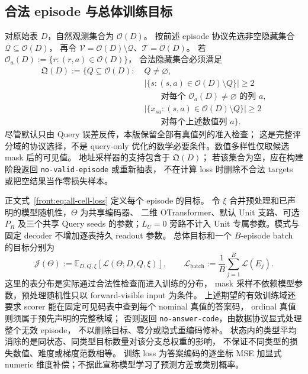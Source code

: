 \documentclass[11pt,UTF8,fontset=fandol]{ctexart}
\numberwithin{equation}{section}
\theoremstyle{definition}
\newcommand{\Oset}{\mathcal O}
\newcommand{\Vset}{\mathcal V}
\newcommand{\Qset}{\mathcal Q}
\newcommand{\TargetSet}{\mathcal T}
\begin{document}
\subsection{合法 episode 与总体训练目标}
对原始表 $D$，自然观测集合为 $\Oset(D)$。
按前述 episode 协议先选非空隐藏集合 $\Qset\subseteq\Oset(D)$，
再令 $\Vset=\Oset(D)\setminus\Qset$、$\TargetSet=\Oset(D)$。
若 $\Oset_a(D):=\{r:(r,a)\in\Oset(D)\}$，
合法隐藏集合必须满足
\begin{equation}
\begin{split}
 \mathfrak Q(D):=\bigl\{Q\subseteq\Oset(D):\;&Q\ne\varnothing,\\
 &|\{s:(s,a)\in\Oset(D)\setminus Q\}|\ge2\\
 &\qquad\text{对每个 }\Oset_a(D)\ne\varnothing\text{ 的列 }a,\\
 &|\{x_{sa}:(s,a)\in\Oset(D)\setminus Q\}|\ge2\\
 &\qquad\text{对每个上述数值列 }a\bigr\}.
\end{split}
\label{eq:T:admissible-masks}
\end{equation}
尽管默认只由 Query 误差反传，本版保留全部有真值列的准入检查；
这是完整评分域的协议选择，不是 query-only 优化的数学必要条件。数值多样性仅取候选 mask 后的可见值。
地址采样器的支持包含于 $\mathfrak Q(D)$；
若该集合为空，应在构建阶段返回 \texttt{no-valid-episode} 或重新抽表，
不在计算 loss 时删除不合法 targets 或把空结果当作零损失样本。

正文式~\eqref{front:eq:all-cell-loss} 定义每个 episode 的目标。
令 $\xi$ 合并预处理和已声明的模型随机性，$\Theta$ 为共享编码器、
二维 OTransformer、默认 Unit 支路、可选 $P_R$ 及三个共享 Query seeds 的参数；$L_U=0$ 旁路不计入 Unit 专属参数。模式与固定 decoder 不增加逐表持久 readout 参数。
总体目标和一个 $B$-episode batch 的目标分别为
\begin{equation}
 \mathcal J(\Theta)
 :=\mathbb E_{D,Q,\xi}\!\left[\mathcal L(\Theta;D,Q,\xi)\right],
 \qquad
 \mathcal L_{\mathrm{batch}}:=\frac1B\sum_{j=1}^B\mathcal L(E_j).
 \label{eq:T:population-objective}
\end{equation}
这里的表分布是实际通过合法性检查而进入训练的分布，
mask 采样不依赖模型参数，预处理随机性只以 forward-visible input 为条件。
上述期望的有效训练域还要求 scorer 能在固定可见码表中查到每个 nominal 真值的答案码，
ordinal 真值则须属于预先声明的完整秩域；
否则返回 \texttt{no-answer-code}，由数据协议显式处理整个无效 episode，
不以删除目标、零分或隐式重编码修补。
状态内的类型平均消除的是同状态、同类型目标数量对该分支总权重的影响，
不保证不同类型的损失数值、难度或梯度范数相等。
训练 loss 为答案编码的逐坐标 MSE 加显式 numeric 维度补偿；不据此宣称模型学习了预测方差或类别概率。
\end{document}
